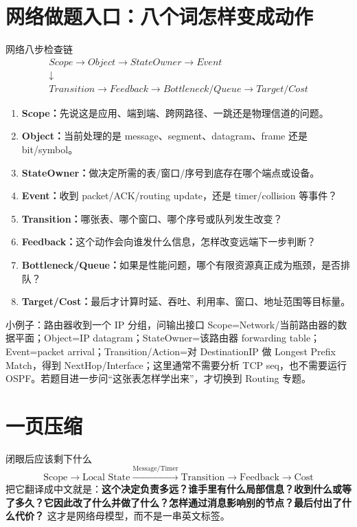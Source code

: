 \documentclass[11pt,a4paper,openany]{ctexbook}
\newcommand{\key}[1]{\textbf{\color{deep}#1}}
\begin{document}
\section{网络做题入口：八个词怎样变成动作}
\begin{examBox}{网络八步检查链}
\[
\boxed{\begin{gathered}
Scope\rightarrow Object\rightarrow StateOwner\rightarrow Event\\
\downarrow\\
Transition\rightarrow Feedback\rightarrow Bottleneck/Queue\rightarrow Target/Cost
\end{gathered}}
\]
\begin{enumerate}
  \item \key{Scope：}先说这是应用、端到端、跨网路径、一跳还是物理信道的问题。
  \item \key{Object：}当前处理的是 message、segment、datagram、frame 还是 bit/symbol。
  \item \key{StateOwner：}做决定所需的表/窗口/序号到底存在哪个端点或设备。
  \item \key{Event：}收到 packet/ACK/routing update，还是 timer/collision 等事件？
  \item \key{Transition：}哪张表、哪个窗口、哪个序号或队列发生改变？
  \item \key{Feedback：}这个动作会向谁发什么信息，怎样改变远端下一步判断？
  \item \key{Bottleneck/Queue：}如果是性能问题，哪个有限资源真正成为瓶颈，是否排队？
  \item \key{Target/Cost：}最后才计算时延、吞吐、利用率、窗口、地址范围等目标量。
\end{enumerate}
\end{examBox}

\begin{methodbox}{小例子：路由器收到一个 IP 分组，问输出接口}
Scope=Network/当前路由器的数据平面；Object=IP datagram；StateOwner=该路由器 forwarding table；Event=packet arrival；Transition/Action=对 DestinationIP 做 Longest Prefix Match，得到 NextHop/Interface；这里通常不需要分析 TCP seq，也不需要运行 OSPF。若题目进一步问“这张表怎样学出来”，才切换到 Routing 专题。
\end{methodbox}

\section{一页压缩}
\begin{corebox}{闭眼后应该剩下什么}
\[
\boxed{\text{Scope}\rightarrow\text{Local State}\xrightarrow{\text{Message/Timer}}\text{Transition}\rightarrow\text{Feedback}\rightarrow\text{Cost}}
\]
把它翻译成中文就是：\key{这个决定负责多远？谁手里有什么局部信息？收到什么或等了多久？它因此改了什么并做了什么？怎样通过消息影响别的节点？最后付出了什么代价？} 这才是网络母模型，而不是一串英文标签。
\end{corebox}
\end{document}
